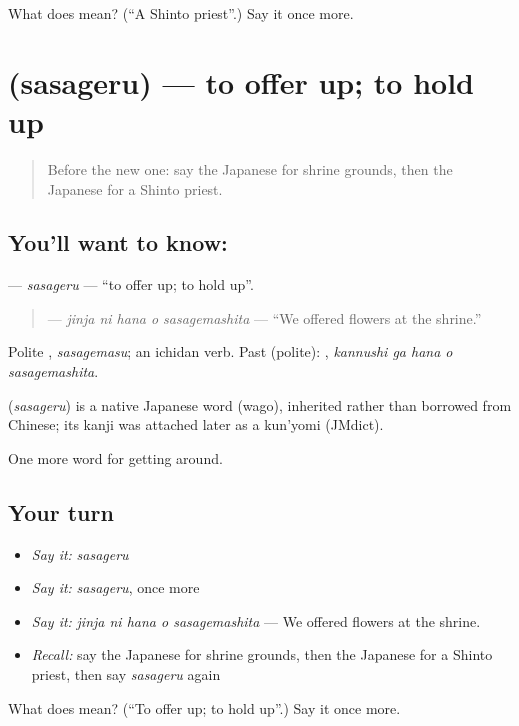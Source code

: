 \begin{tcolorbox}[breakable,colback=teal!4,colframe=teal!35!black,title={Before you move on}]
What does  mean? (\textquotedblleft{}A Shinto priest\textquotedblright{}.) Say it once more.
\end{tcolorbox}
\section[\texorpdfstring{\ja{ささげる} (sasageru)}{ささげる (sasageru)}]{ (sasageru) — to offer up; to hold up}

\label{lesson:JA-C406-sasageru}



\begin{quote}
Before the new one: say the Japanese for shrine grounds, then the Japanese for a Shinto priest.
\end{quote}

\subsection*{You'll want to know: }
\textbf{} — \emph{sasageru} — \textquotedblleft{}to offer up; to hold up\textquotedblright{}.

\begin{quote}
\textbf{  } — \emph{jinja ni hana o sasagemashita} — \textquotedblleft{}We offered flowers at the shrine.\textquotedblright{}
\end{quote}

Polite \textbf{}, \emph{sasagemasu}; an ichidan verb. Past (polite): \textbf{  }, \emph{kannushi ga hana o sasagemashita}.

\begin{cousinweb}
\textbf{} (\emph{sasageru}) is a native Japanese word (wago), inherited rather than borrowed from Chinese; its kanji was attached later as a kun'yomi (JMdict).
\end{cousinweb}

\begin{grammarlens}[title={What you've built}]
One more word for getting around.
\end{grammarlens}

\subsection*{Your turn}
\begin{itemize}
\raggedright
  \item \emph{Say it:} \emph{sasageru}
  \item \emph{Say it:} \emph{sasageru}, once more
  \item \emph{Say it:} \emph{jinja ni hana o sasagemashita} — We offered flowers at the shrine.
  \item \emph{Recall:} say the Japanese for shrine grounds, then the Japanese for a Shinto priest, then say \emph{sasageru} again
\end{itemize}

\begin{tcolorbox}[breakable,colback=teal!4,colframe=teal!35!black,title={Before you move on}]
What does  mean? (\textquotedblleft{}To offer up; to hold up\textquotedblright{}.) Say it once more.
\end{tcolorbox}
